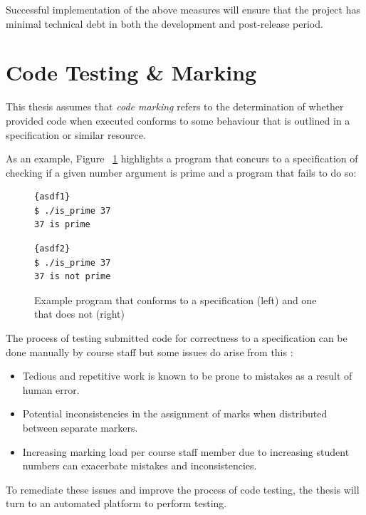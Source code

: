 \documentclass[hidelinks, 12pt]{extreport}
\begin{document}
Successful implementation of the above measures will ensure that the project has minimal technical debt in both the development and post-release period.
\clearpage

\section{Code Testing \& Marking}

This thesis assumes that \textit{code marking} refers to the determination of whether provided code when executed conforms to some behaviour that is outlined in a specification or similar resource.

As an example, Figure ~\ref{fig:markfigure1} highlights a program that concurs to a specification of checking if a given number argument is prime and a program that fails to do so:

\begin{figure}[h]
	\centering
	\noindent
	\begin{multicols}{2}
		\begin{lstlisting}[linewidth=0.95\linewidth, title=Correct Program, frame=tlrb]{asdf1}
$ ./is_prime 37
37 is prime
		\end{lstlisting}
		\begin{lstlisting}[linewidth=0.95\linewidth, title=Incorrect Program, frame=tlrb]{asdf2}
$ ./is_prime 37
37 is not prime
		\end{lstlisting}
	\end{multicols}
	\caption{Example program that conforms to a specification (left) and one that does not (right)}
	\label{fig:markfigure1}
\end{figure}

The process of testing submitted code for correctness to a specification can be done manually by course staff but some issues do arise from this \cite{ManualProblem}:
\begin{itemize}
	\item Tedious and repetitive work is known to be prone to mistakes as a result of human error.
	\item Potential inconsistencies in the assignment of marks when distributed between separate markers.
	\item Increasing marking load per course staff member due to increasing student numbers can exacerbate mistakes and inconsistencies.
\end{itemize}

To remediate these issues and improve the process of code testing, the thesis will turn to an automated platform to perform testing. 
\end{document}

